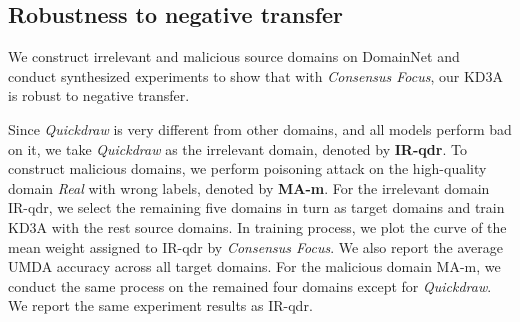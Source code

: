 \documentclass{article}
\begin{document}
\subsection{Robustness to negative transfer}
We construct irrelevant and malicious source domains on DomainNet and conduct synthesized experiments to show that with \textit{Consensus Focus}, our KD3A is robust to negative transfer. 

Since \textit{\textit{Quickdraw}} is very different from other domains, and all models perform bad on it, we take \textit{Quickdraw} as the irrelevant domain, denoted by \textbf{IR-qdr}. To construct malicious domains, we perform poisoning attack \citep{DBLP:conf/aistats/BagdasaryanVHES20} on the high-quality domain \textit{Real} with  wrong labels, denoted by \textbf{MA-m}. For the irrelevant domain IR-qdr, we select the remaining five domains in turn as target domains and train KD3A with the rest source domains. In training process, we plot the curve of the mean weight  assigned to IR-qdr by \textit{Consensus Focus}. We also report the average UMDA accuracy across all target domains. For the malicious domain MA-m, we conduct the same process on the remained four domains except for \textit{Quickdraw}. We report the same experiment results as IR-qdr. 
\end{document}
